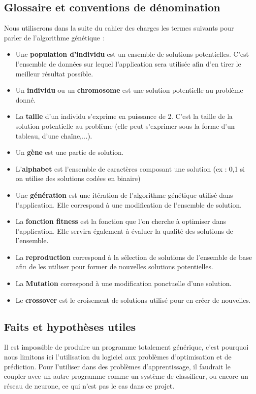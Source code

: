 \documentclass[a4paper,11pt]{article}
\begin{document}
		\subsection{Glossaire et conventions de dénomination}
			Nous utiliserons dans la suite du cahier des charges les termes suivants pour parler de l’algorithme génétique :\\
			\begin{itemize}
			\item Une \textbf{population d’individu} est un ensemble de solutions potentielles. C’est l’ensemble de données sur lequel l’application sera utilisée afin d’en tirer le meilleur résultat possible.
			\item Un \textbf{individu} ou un \textbf{chromosome} est une solution potentielle au problème donné.
			\item La \textbf{taille} d’un individu s’exprime en puissance de 2. C’est la taille de la solution potentielle au problème (elle peut s’exprimer sous la forme d’un tableau, d’une chaîne,...).
			\item Un \textbf{gène}  est une partie de solution.
			\item L’\textbf{alphabet} est l’ensemble de caractères composant une solution (ex : {0,1} si on utilise des solutions codées en binaire)
			\item Une \textbf{génération } est une itération de l’algorithme génétique utilisé dans l’application. Elle correspond à une modification de l’ensemble de solution. 
			\item La \textbf{fonction fitness} est la fonction que l’on cherche à optimiser dans l’application. Elle servira également à évaluer la qualité des solutions de l’ensemble.
			\item La \textbf{reproduction} correspond à la sélection de solutions de l’ensemble de base afin de les utiliser pour former de nouvelles solutions potentielles.
			\item La \textbf{Mutation} correspond à une modification ponctuelle d’une solution.
			\item Le \textbf{crossover} est le croisement de solutions utilisé pour en créer de nouvelles.
			\end{itemize}
			
		\subsection{Faits et hypothèses utiles}
			Il est impossible de produire un programme totalement générique, c’est pourquoi nous limitons ici l’utilisation du logiciel aux problèmes d’optimisation et de prédiction. 
			Pour l’utiliser dans des problèmes d’apprentissage, il faudrait le coupler avec un autre programme comme un système de classifieur, ou encore un réseau de neurone, ce qui n’est pas le cas dans ce projet.
\end{document}
